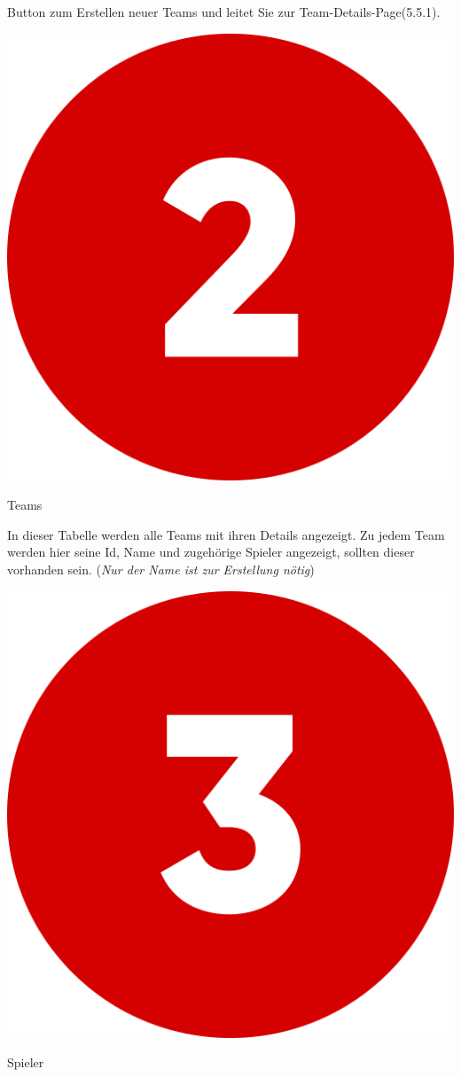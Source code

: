 Button zum Erstellen neuer Teams und leitet Sie zur Team-Details-Page(5.5.1).

\bigskip
\includegraphics[scale=0.05]{pics/user-guide/numbers/number-2.png} \begin{LARGE} Teams \end{LARGE}

In dieser Tabelle werden alle Teams mit ihren Details angezeigt. Zu jedem Team werden hier seine Id, Name und zugehörige Spieler angezeigt,
sollten dieser vorhanden sein. (\textit{Nur der Name ist zur Erstellung nötig})

\bigskip
\includegraphics[scale=0.05]{pics/user-guide/numbers/number-3.png} \begin{LARGE} Spieler \end{LARGE}

